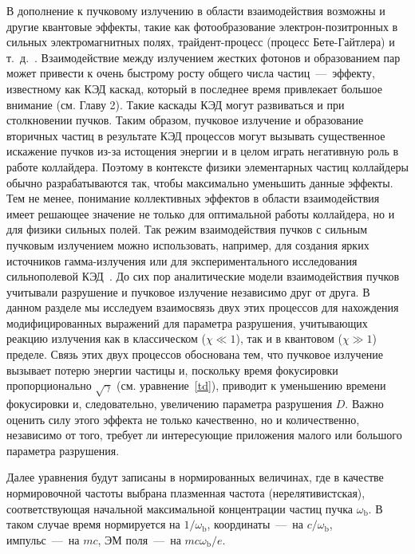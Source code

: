 В дополнение к пучковому излучению в области взаимодействия возможны и другие квантовые эффекты, такие как фотообразование электрон-позитронных в сильных электромагнитных полях, трайдент-процесс (процесс Бете-Гайтлера) и т. д.~\cite{chen1989coherent,hartin2018strong}.
Взаимодействие между излучением жестких фотонов и образованием пар может привести к очень быстрому росту общего числа частиц~---~эффекту, известному как КЭД каскад, который в последнее время привлекает большое внимание (см. Главу 2).
Такие каскады КЭД могут развиваться и при столкновении пучков.
Таким образом, пучковое излучение и образование вторичных частиц в результате КЭД процессов могут вызывать существенное искажение пучков из-за истощения энергии и в целом играть негативную роль в работе коллайдера.
Поэтому в контексте физики элементарных частиц коллайдеры обычно разрабатываются так, чтобы максимально уменьшить данные эффекты.
Тем не менее, понимание коллективных эффектов в области взаимодействия имеет решающее значение не только для оптимальной работы коллайдера, но и для физики сильных полей.
Так режим взаимодействия пучков с сильным пучковым излучением можно использовать, например, для создания ярких источников гамма-излучения или для экспериментального исследования сильнополевой КЭД~\cite{del2019bright,song2021generation,tamburini2020efficient}.
До сих пор аналитические модели взаимодействия пучков учитывали разрушение и пучковое излучение независимо друг от друга.
В данном разделе мы исследуем взаимосвязь двух этих процессов для нахождения модифицированных выражений для параметра разрушения, учитывающих реакцию излучения как в классическом ($\chi\ll1$), так и в квантовом ($ \chi\gg1$) пределе.
Связь этих двух процессов обоснована тем, что пучковое излучение вызывает потерю энергии частицы и, поскольку время фокусировки пропорционально $\sqrt{\gamma}$ (см. уравнение~\eqref{td}), приводит к уменьшению времени фокусировки и, следовательно, увеличению параметра разрушения $D$.
Важно оценить силу этого эффекта не только качественно, но и количественно, независимо от того, требует ли интересующие приложения малого или большого параметра разрушения.

Далее уравнения будут записаны в нормированных величинах, где в качестве нормировочной частоты выбрана плазменная частота (нерелятивистская), соответствующая начальной максимальной концентрации частиц пучка $\omega_\mathrm{b}$.
В таком случае время нормируется на $ 1/\omega_\mathrm{b}$, координаты~---~на $c/\omega_\mathrm{b}$, импульс~---~на $mc$, ЭМ поля~---~на $mc\omega_\mathrm{b}/e$.

